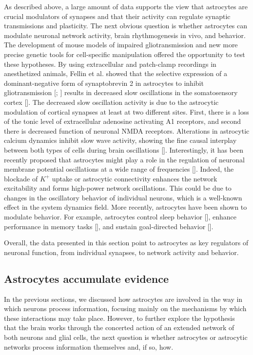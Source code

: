 As described above, a large amount of data supports the view that astrocytes are crucial modulators of synapses and that their activity can regulate synaptic transmissions and plasticity. 
The next obvious question is whether astrocytes can modulate neuronal network activity, brain rhythmogenesis in vivo, and behavior. 
The development of mouse models of impaired gliotransmission and new more precise genetic tools for cell-specific manipulation offered the opportunity to test these hypotheses. 
By using extracellular and patch-clamp recordings in anesthetized animals, Fellin et al. showed that the selective expression of a dominant-negative form of synaptobrevin 2 in astrocytes to inhibit gliotransmission [\cite{pascual2005}; \cite{zhang2004}] results in decreased slow oscillations in the somatosensory cortex [\cite{fellin2009endogenous}]. 
The decreased slow oscillation activity is due to the astrocytic modulation of cortical synapses at least at two different sites. 
First, there is a loss of the tonic level of extracellular adenosine activating A1 receptors, and second there is decreased function of neuronal NMDA receptors. 
Alterations in astrocytic calcium dynamics inhibit slow wave activity, showing the fine causal interplay between both types of cells during brain oscillations [\cite{szabo2017extensive}].
Interestingly, it has been recently proposed that astrocytes might play a role in the regulation of neuronal membrane potential oscillations at a wide range of frequencies [\cite{bellot2018astrocytic}].
Indeed, the blockade of $K^+$ uptake or astrocytic connectivity enhances the network excitability and forms high-power network oscillations.
This could be due to changes in the oscillatory behavior of individual neurons, which is a well-known effect in the system dynamics field.
More recently, astrocytes have been shown to modulate behavior. 
For example, astrocytes control sleep behavior [\cite{halassa2009astrocytic}], enhance performance in memory tasks [\cite{adamsky2018astrocytic}], and sustain goal-directed behavior [\cite{mederos2020gabaergic}].

Overall, the data presented in this section point to astrocytes as key regulators of neuronal function, from individual synapses, to network activity and behavior. 

\subsection{Astrocytes accumulate evidence}
\label{chap1:sec:2:subsec4:astro_evidence}
In the previous sections, we discussed how astrocytes are involved in the way in which neurons process information, focusing mainly on the mechanisms by which these interactions may take place.
However, to further explore the hypothesis that the brain works through the concerted action of an extended network of both neurons and glial cells, the next question is whether astrocytes or astrocytic networks process information themselves and, if so, how. 

